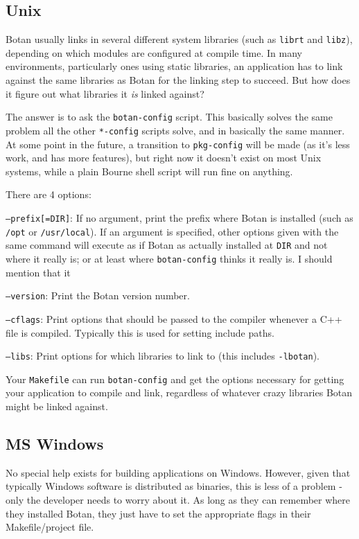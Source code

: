 \documentclass{article}
\newcommand{\filename}[1]{\texttt{#1}}
\begin{document}
\subsection{Unix}

Botan usually links in several different system libraries (such as
\texttt{librt} and \texttt{libz}), depending on which modules are
configured at compile time. In many environments, particularly ones
using static libraries, an application has to link against the same
libraries as Botan for the linking step to succeed. But how does it
figure out what libraries it \emph{is} linked against?

The answer is to ask the \filename{botan-config} script. This
basically solves the same problem all the other \filename{*-config}
scripts solve, and in basically the same manner. At some point in the
future, a transition to \filename{pkg-config} will be made (as it's
less work, and has more features), but right now it doesn't exist on
most Unix systems, while a plain Bourne shell script will run fine on
anything.

There are 4 options:

\texttt{--prefix[=DIR]}: If no argument, print the prefix where Botan
is installed (such as \filename{/opt} or \filename{/usr/local}). If an
argument is specified, other options given with the same command will
execute as if Botan as actually installed at \filename{DIR} and not
where it really is; or at least where \filename{botan-config} thinks
it really is. I should mention that it

\texttt{--version}: Print the Botan version number.

\texttt{--cflags}: Print options that should be passed to the compiler
whenever a C++ file is compiled. Typically this is used for setting
include paths.

\texttt{--libs}: Print options for which libraries to link to (this includes
\texttt{-lbotan}).

Your \filename{Makefile} can run \filename{botan-config} and get the
options necessary for getting your application to compile and link,
regardless of whatever crazy libraries Botan might be linked against.

\subsection{MS Windows}

No special help exists for building applications on Windows. However,
given that typically Windows software is distributed as binaries, this
is less of a problem - only the developer needs to worry about it. As
long as they can remember where they installed Botan, they just have
to set the appropriate flags in their Makefile/project file.
\end{document}
